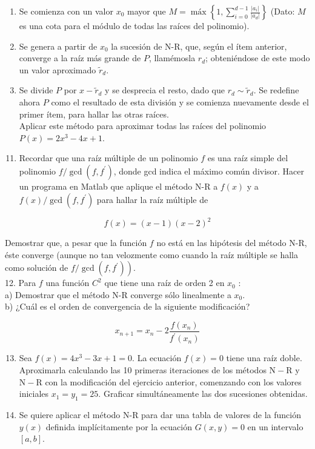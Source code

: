 \documentclass[10pt]{article}
\begin{document}
\begin{enumerate}
  \item Se comienza con un valor $x_{0}$ mayor que $M=\operatorname{máx}\left\{1, \sum_{i=0}^{d-1} \frac{\left|a_{i}\right|}{\left|a_{d}\right|}\right\}$ (Dato: $M$ es una cota para el módulo de todas las raíces del polinomio).
  \item Se genera a partir de $x_{0}$ la sucesión de N-R, que, según el ítem anterior, converge a la raíz más grande de $P$, llamémosla $r_{d}$; obteniéndose de este modo un valor aproximado $\tilde{r}_{d}$.
  \item Se divide $P$ por $x-\tilde{r}_{d}$ y se desprecia el resto, dado que $r_{d} \sim \tilde{r}_{d}$. Se redefine ahora $P$ como el resultado de esta división y se comienza nuevamente desde el primer ítem, para hallar las otras raíces.\\
Aplicar este método para aproximar todas las raíces del polinomio $P(x)=2 x^{3}- 4 x+1$.
\end{enumerate}

\begin{enumerate}
  \setcounter{enumi}{10}
  \item Recordar que una raíz múltiple de un polinomio $f$ es una raíz simple del polinomio $f / \operatorname{gcd}\left(f, f^{\prime}\right)$, donde gcd indica el máximo común divisor. Hacer un programa en Matlab que aplique el método N-R a $f(x)$ y a $f(x) / \operatorname{gcd}\left(f, f^{\prime}\right)$ para hallar la raíz múltiple de
\end{enumerate}

$$
f(x)=(x-1)(x-2)^{2}
$$

Demostrar que, a pesar que la función $f$ no está en las hipótesis del método N-R, éste converge (aunque no tan velozmente como cuando la raíz múltiple se halla como solución de $\left.f / \operatorname{gcd}\left(f, f^{\prime}\right)\right)$.\\
12. Para $f$ una función $C^{2}$ que tiene una raíz de orden 2 en $x_{0}$ :\\
a) Demostrar que el método N-R converge sólo linealmente a $x_{0}$.\\
b) ¿Cuál es el orden de convergencia de la siguiente modificación?

$$
x_{n+1}=x_{n}-2 \frac{f\left(x_{n}\right)}{f^{\prime}\left(x_{n}\right)}
$$

\begin{enumerate}
  \setcounter{enumi}{12}
  \item Sea $f(x)=4 x^{3}-3 x+1=0$. La ecuación $f(x)=0$ tiene una raíz doble. Aproximarla calculando las 10 primeras iteraciones de los métodos $\mathrm{N}-\mathrm{R}$ y $\mathrm{N}-\mathrm{R}$ con la modificación del ejercicio anterior, comenzando con los valores iniciales $x_{1}=y_{1}=25$. Graficar simultáneamente las dos sucesiones obtenidas.
  \item Se quiere aplicar el método N-R para dar una tabla de valores de la función $y(x)$ definida implícitamente por la ecuación $G(x, y)=0$ en un intervalo $[a, b]$.
\end{enumerate}
\end{document}
